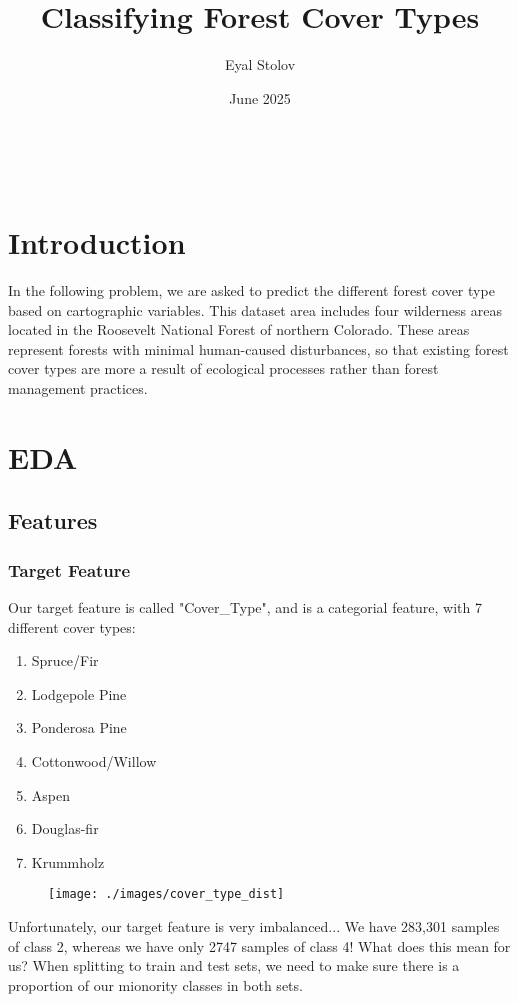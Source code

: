 \documentclass[11pt]{article}
\author{Eyal Stolov}
\date{June 2025}
\title{Classifying Forest Cover Types}
\begin{document}
    \maketitle

    \

    \section*{Introduction}
    In the following problem, we are asked to predict the different forest cover type based on cartographic variables.
    This dataset area includes four wilderness areas located in the Roosevelt National Forest of northern Colorado. These areas represent forests with minimal human-caused disturbances, so that existing forest cover types are more a result of ecological processes rather than forest management practices.

    \section*{EDA}

    \subsection*{Features}
    \subsubsection*{Target Feature}
    Our target feature is called "Cover\_Type", and is a categorial feature, with 7 different cover types:

    \begin{enumerate}
     \item Spruce/Fir
     \item Lodgepole Pine
     \item Ponderosa Pine
     \item Cottonwood/Willow
     \item Aspen
     \item Douglas-fir
     \item Krummholz
    \end{enumerate}

    \begin{figure}[H]
        \centering
        \texttt{[image: ./images/cover\_type\_dist]}
    \end{figure}

    Unfortunately, our target feature is very imbalanced... We have 283,301 samples of class 2, whereas we have only 2747 samples of class 4!
    What does this mean for us?
    When splitting to train and test sets, we need to make sure there is a proportion of our mionority classes in both sets.
\end{document}
